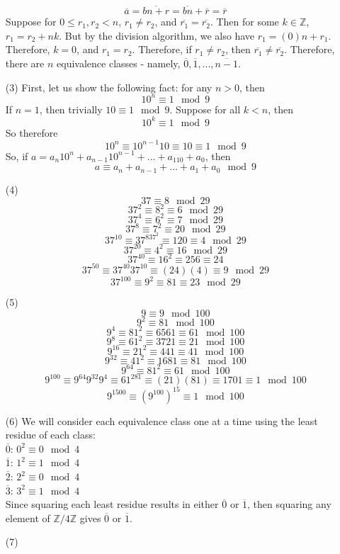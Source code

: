 \documentclass[12pt]{article}
\begin{document}
\begin{itemize}
$$\overline{a} = \overline{bn + r} = \overline{bn} + \overline{r} = \overline{r}$$
Suppose for $0 \leq r_1, r_2 < n$, $r_1 \neq r_2$, and $\overline{r_1} = \overline{r_2}$. Then for some $k \in \mathbb{Z}$, $r_1 = r_2 + nk$. But by the division algorithm, we also have $r_1 = (0)n + r_1$. Therefore, $k = 0$, and $r_1 = r_2$. Therefore, if $r_1 \neq r_2$, then $\overline{r_1} \neq \overline{r_2}$. Therefore, there are $n$ equivalence classes - namely, $\overline{0}, \overline{1}, ..., \overline{n-1}$.
\item[(3)]
First, let us show the following fact: for any $n > 0$, then 
$$10^n \equiv 1 \mod 9$$
If $n = 1$, then trivially $10 \equiv 1 \mod 9$. Suppose for all $k < n$, then
$$10^k \equiv 1 \mod 9$$
So therefore
$$10^n \equiv 10^{n-1}10 \equiv 10 \equiv 1 \mod 9$$
So, if $a = a_n10^n + a_{n-1}10^{n-1} + ... + a_110 + a_0$, then 
$$a \equiv a_n + a_{n - 1} + ... + a_1 + a_0 \mod 9$$
\item[(4)]
$$37 \equiv 8 \mod 29$$
$$37^2 \equiv 8^2 \equiv 6 \mod 29$$
$$37^4 \equiv 6^2 \equiv 7 \mod 29$$
$$37^8 \equiv 7^2 \equiv 20 \mod 29$$
$$37^{10} \equiv 37^837^2 \equiv 120 \equiv 4 \mod 29$$
$$37^{20} \equiv 4^2 \equiv 16 \mod 29$$
$$37^{40} \equiv 16^2 \equiv 256 \equiv 24$$
$$37^{50} \equiv 37^{40}37^{10} \equiv (24)(4) \equiv 9 \mod 29$$
$$37^{100} \equiv 9^2 \equiv 81 \equiv 23 \mod 29$$
\item[(5)]
$$9 \equiv 9 \mod 100$$
$$9^2 \equiv 81 \mod 100$$
$$9^4 \equiv 81^2 \equiv 6561 \equiv 61 \mod 100$$
$$9^8 \equiv 61^2 \equiv 3721 \equiv 21 \mod 100$$
$$9^{16} \equiv 21^2 \equiv 441 \equiv 41 \mod 100$$
$$9^{32} \equiv 41^2 \equiv 1681 \equiv 81 \mod 100$$
$$9^{64} \equiv 81^2 \equiv 61 \mod 100$$
$$9^{100} \equiv 9^{64}9^{32}9^4 \equiv 61^281 \equiv (21)(81) \equiv 1701 \equiv 1 \mod 100$$
$$9^{1500} \equiv (9^{100})^{15} \equiv 1 \mod 100$$
\item[(6)]
We will consider each equivalence class one at a time using the least residue of each class: \\
$\overline{0}$: $0^2 \equiv 0 \mod 4$ \\
$\overline{1}$: $1^2 \equiv 1 \mod 4$ \\
$\overline{2}$: $2^2 \equiv 0 \mod 4$ \\
$\overline{3}$: $3^2 \equiv 1 \mod 4$ \\
Since squaring each least residue results in either $\overline{0}$ or $\overline{1}$, then squaring any element of $\mathbb{Z}/4\mathbb{Z}$ gives $\overline{0}$ or $\overline{1}$.
\item[(7)]

\end{itemize}
\end{document}
